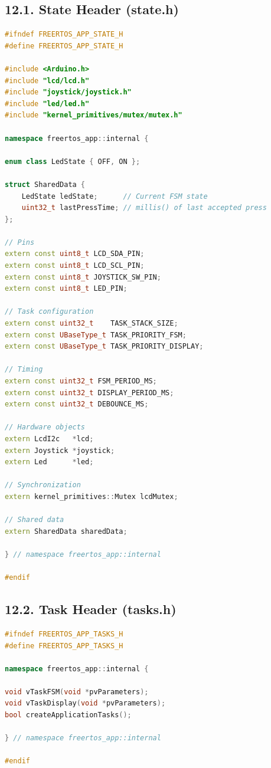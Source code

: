 \documentclass[12pt]{article}
\begin{document}
\subsection*{12.1. State Header (state.h)}

\begin{lstlisting}[language=C++, caption=state.h – Shared State Definition]
#ifndef FREERTOS_APP_STATE_H
#define FREERTOS_APP_STATE_H

#include <Arduino.h>
#include "lcd/lcd.h"
#include "joystick/joystick.h"
#include "led/led.h"
#include "kernel_primitives/mutex/mutex.h"

namespace freertos_app::internal {

enum class LedState { OFF, ON };

struct SharedData {
    LedState ledState;      // Current FSM state
    uint32_t lastPressTime; // millis() of last accepted press
};

// Pins
extern const uint8_t LCD_SDA_PIN;
extern const uint8_t LCD_SCL_PIN;
extern const uint8_t JOYSTICK_SW_PIN;
extern const uint8_t LED_PIN;

// Task configuration
extern const uint32_t    TASK_STACK_SIZE;
extern const UBaseType_t TASK_PRIORITY_FSM;
extern const UBaseType_t TASK_PRIORITY_DISPLAY;

// Timing
extern const uint32_t FSM_PERIOD_MS;
extern const uint32_t DISPLAY_PERIOD_MS;
extern const uint32_t DEBOUNCE_MS;

// Hardware objects
extern LcdI2c   *lcd;
extern Joystick *joystick;
extern Led      *led;

// Synchronization
extern kernel_primitives::Mutex lcdMutex;

// Shared data
extern SharedData sharedData;

} // namespace freertos_app::internal

#endif
\end{lstlisting}

\subsection*{12.2. Task Header (tasks.h)}

\begin{lstlisting}[language=C++, caption=tasks.h – Task Function Declarations]
#ifndef FREERTOS_APP_TASKS_H
#define FREERTOS_APP_TASKS_H

namespace freertos_app::internal {

void vTaskFSM(void *pvParameters);
void vTaskDisplay(void *pvParameters);
bool createApplicationTasks();

} // namespace freertos_app::internal

#endif
\end{lstlisting}
\end{document}
